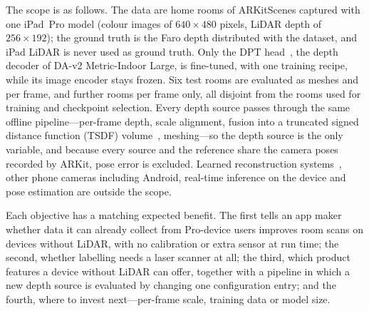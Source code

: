 The scope is as follows. The data are home rooms of ARKitScenes captured with one iPad~Pro model (colour images of
$640\times480$ pixels, LiDAR depth of $256\times192$); the ground truth is the Faro depth distributed with the dataset,
and iPad LiDAR is never used as ground truth. Only the DPT head~\cite{dpt}, the depth decoder of DA-v2 Metric-Indoor
Large, is fine-tuned, with one training recipe, while its image encoder stays frozen. Six test rooms are evaluated as
meshes and per frame, and \rsVN{} further rooms per frame only, all disjoint from the rooms used for training and
checkpoint selection. Every depth source passes through the same offline pipeline---per-frame depth, scale alignment,
fusion into a truncated signed distance function (TSDF) volume~\cite{curless96}, meshing---so the depth source is the
only variable, and because every source and the reference share the camera poses recorded by ARKit, pose error is
excluded. Learned reconstruction systems~\cite{atlas,neuralrecon,simplerecon}, other phone cameras including Android,
real-time inference on the device and pose estimation are outside the scope.

Each objective has a matching expected benefit. The first tells an app maker whether data it can already collect from
Pro-device users improves room scans on devices without LiDAR, with no calibration or extra sensor at run time; the
second, whether labelling needs a laser scanner at all; the third, which product features a device without LiDAR can
offer, together with a pipeline in which a new depth source is evaluated by changing one configuration entry; and the
fourth, where to invest next---per-frame scale, training data or model size.
